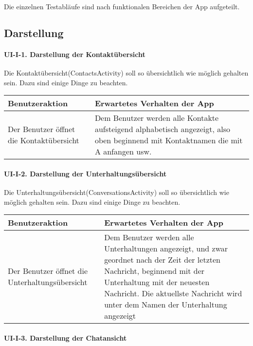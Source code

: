 
Die einzelnen Testabläufe sind nach funktionalen Bereichen der App
aufgeteilt.


\subsection{Darstellung}\label{i-darstellung}

\paragraph{UI-I-1. Darstellung der
Kontaktübersicht}\label{darstellung-der-kontaktuxfcbersicht}

Die Kontaktübersicht(ContactsActivity) soll so übersichtlich wie möglich
gehalten sein. Dazu sind einige Dinge zu beachten.

\begin{longtable}{|p{8cm}|p{8.5cm}|}
\hline
Benutzeraktion & Erwartetes Verhalten der App\tabularnewline
\hline

Der Benutzer öffnet die Kontaktübersicht & Dem Benutzer werden alle
Kontakte aufsteigend alphabetisch angezeigt, also oben beginnend mit
Kontaktnamen die mit A anfangen usw.\tabularnewline
\hline
\end{longtable}

\paragraph{UI-I-2. Darstellung der
Unterhaltungsübersicht}\label{darstellung-der-unterhaltungsuxfcbersicht}

Die Unterhaltungsübersicht(ConversationsActivity) soll so übersichtlich
wie möglich gehalten sein. Dazu sind einige Dinge zu beachten.

\begin{longtable}{|p{8cm}|p{8.5cm}|}
\hline
Benutzeraktion & Erwartetes Verhalten der App\tabularnewline
\hline

Der Benutzer öffnet die Unterhaltungsübersicht & Dem Benutzer werden
alle Unterhaltungen angezeigt, und zwar geordnet nach der Zeit der
letzten Nachricht, beginnend mit der Unterhaltung mit der neuesten
Nachricht. Die aktuellste Nachricht wird unter dem Namen der
Unterhaltung angezeigt\tabularnewline
\hline
\end{longtable}

\paragraph{UI-I-3. Darstellung der
Chatansicht}\label{darstellung-der-chatansicht}

